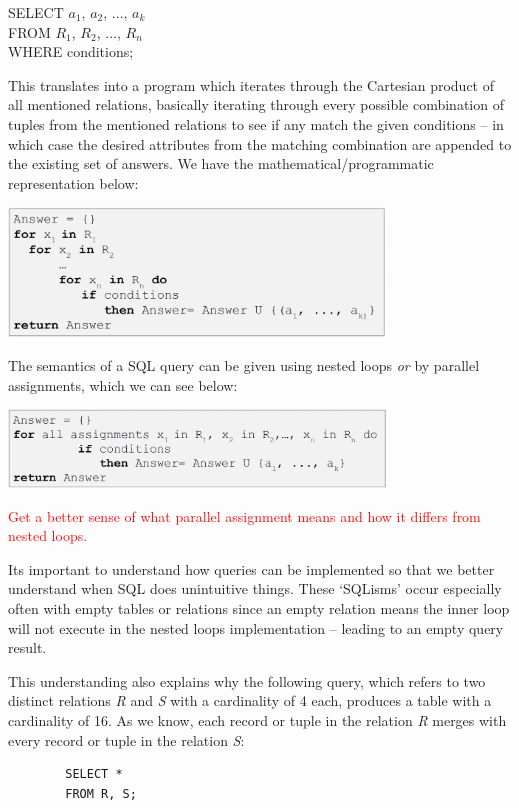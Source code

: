 \documentclass{article}
\begin{document}
\begin{tcolorbox}
        SELECT $a_1$, $a_2$, $\ldots$, $a_k$ \\
        FROM $R_1$, $R_2$, $\ldots$, $R_n$ \\
        WHERE conditions;\\
\end{tcolorbox}

This translates into a program which iterates through the Cartesian product of all mentioned relations, basically iterating through every possible combination of tuples from the mentioned relations to see if any match the given conditions -- in which case the desired attributes from the matching combination are appended to the existing set of answers. We have the mathematical/programmatic representation below:

\includegraphics[width=10cm]{assets/nestedLoopsQuery.png}

The semantics of a SQL query can be given using nested loops \textit{or} by parallel assignments, which we can see below:

\includegraphics[width=10cm]{assets/parallelAssignmentQuery.png}

\textcolor{red}{Get a better sense of what parallel assignment means and how it differs from nested loops.}

Its important to understand how queries can be implemented so that we better understand when SQL does unintuitive things. These `SQLisms' occur especially often with empty tables or relations since an empty relation means the inner loop will not execute in the nested loops implementation -- leading to an empty query result.

This understanding also explains why the following query, which refers to two distinct relations \textit{R} and \textit{S} with a cardinality of 4 each, produces a table with a cardinality of 16. As we know, each record or tuple in the relation \textit{R} merges with every record or tuple in the relation \textit{S}:

\begin{tcolorbox}
    \begin{verbatim}
        SELECT *
        FROM R, S;
    \end{verbatim}
\end{tcolorbox}
\end{document}
